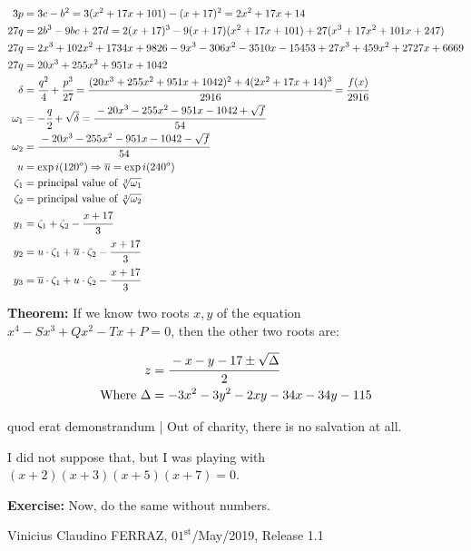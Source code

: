 \documentclass[11pt,a4paper]{article}
\begin{document}
\begin{align}
3p &= 3c - b^2 = 3(x^2 + 17 x + 101) - (x + 17)^2 = 2x^2 + 17x + 14 \\
27q &= 2 b^3 - 9 bc + 27 d = 2 (x + 17)^3 - 9 (x + 17)(x^2 + 17 x + 101) + 27(x^3 + 17x^2 + 101x + 247) \\
27q &= 2x^3 + 102x^2 + 1734 x + 9826 - 9 x^3 - 306 x^2 - 3510 x - 15453 + 27 x^3 + 459 x^2 + 2727 x + 6669 \\
27q &= 20x^3 + 255x^2 + 951 x + 1042 \\
\delta &= \cfrac{q^2}{4} + \cfrac{p^3}{27} = \cfrac{(20x^3 + 255x^2 + 951 x + 1042)^2 + 4 (2x^2 + 17x + 14)^3}{2916} = \cfrac{f(x)}{2916} \\
\omega_1 &= -\cfrac{q}{2} + \sqrt{\delta} = \cfrac{-20x^3 - 255x^2 - 951 x - 1042 + \sqrt{f}}{54} \\
\omega_2 &= \cfrac{-20x^3 - 255x^2 - 951 x - 1042 - \sqrt{f}}{54} \\
u &= \exp i(120^o) \Rightarrow \overline{u} = \exp i(240^o) \\
\zeta_1 &= \text{principal value of } \sqrt[3]{\omega_1} \\
\zeta_2 &= \text{principal value of } \sqrt[3]{\omega_2} \\
y_1 &= \zeta_1 + \zeta_2 - \cfrac{x + 17}{3} \\
y_2 &= u \cdot \zeta_1 + \overline{u} \cdot \zeta_2 - \cfrac{x + 17}{3} \\
y_3 &= \overline{u} \cdot \zeta_1 + u \cdot \zeta_2 - \cfrac{x + 17}{3}
\end{align}

\vspace{3mm}

\textbf{Theorem: }If we know two roots $x, y$ of the equation $x^4 - Sx^3 + Qx^2 - Tx + P = 0$, then the other two roots are:

\begin{align}
z &= \cfrac{- x - y - 17 \pm \sqrt{\Delta}}{2} \\
\text{Where } \Delta &= -3 x^2 -3 y^2 - 2xy - 34x - 34y - 115
\end{align}

\vspace{3mm}

quod erat demonstrandum | Out of charity, there is no salvation at all.

\vspace{3mm}

I did not suppose that, but I was playing with $(x + 2)(x + 3)(x + 5)(x + 7) = 0$.

\vspace{3mm}

\textbf{Exercise: } Now, do the same without numbers.

\vspace{3mm}

Vinicius Claudino FERRAZ, $01^{\text{st}}$/May/2019, Release 1.1
\end{document}
